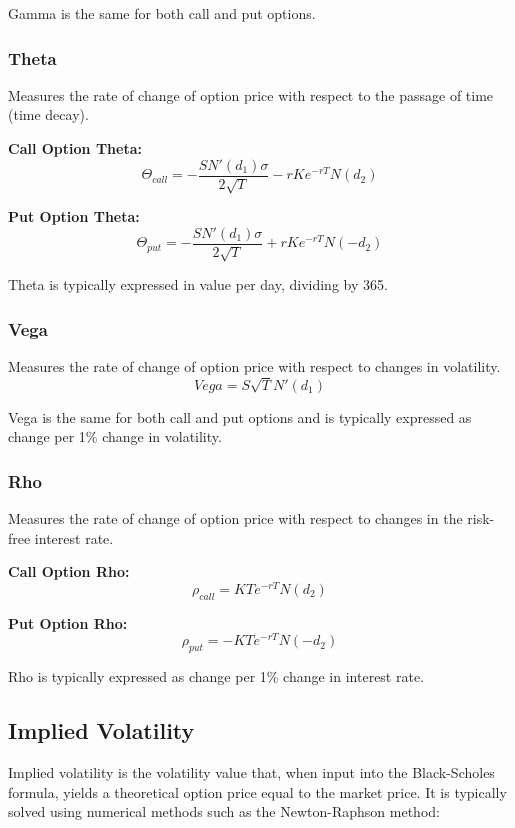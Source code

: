 \documentclass{article}
\begin{document}
Gamma is the same for both call and put options.

\subsubsection{Theta}
Measures the rate of change of option price with respect to the passage of time (time decay).

\textbf{Call Option Theta:}
\begin{equation}
\Theta_{call} = -\frac{S N'(d_1)\sigma}{2\sqrt{T}} - rKe^{-rT}N(d_2)
\end{equation}

\textbf{Put Option Theta:}
\begin{equation}
\Theta_{put} = -\frac{S N'(d_1)\sigma}{2\sqrt{T}} + rKe^{-rT}N(-d_2)
\end{equation}

Theta is typically expressed in value per day, dividing by 365.

\subsubsection{Vega}
Measures the rate of change of option price with respect to changes in volatility.
\begin{equation}
Vega = S\sqrt{T}N'(d_1)
\end{equation}

Vega is the same for both call and put options and is typically expressed as change per 1\% change in volatility.

\subsubsection{Rho}
Measures the rate of change of option price with respect to changes in the risk-free interest rate.

\textbf{Call Option Rho:}
\begin{equation}
\rho_{call} = KTe^{-rT}N(d_2)
\end{equation}

\textbf{Put Option Rho:}
\begin{equation}
\rho_{put} = -KTe^{-rT}N(-d_2)
\end{equation}

Rho is typically expressed as change per 1\% change in interest rate.

\subsection{Implied Volatility}
Implied volatility is the volatility value that, when input into the Black-Scholes formula, yields a theoretical option price equal to the market price. It is typically solved using numerical methods such as the Newton-Raphson method:
\end{document}
